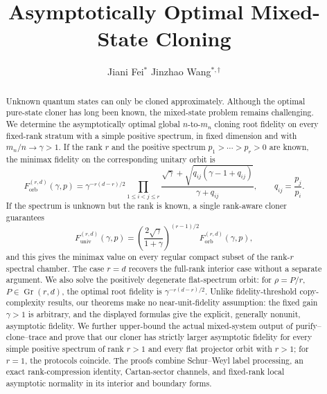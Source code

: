 \documentclass[11pt]{article}
\title{Asymptotically Optimal Mixed-State Cloning}
\author{Jiani Fei\(^{*}\)\qquad
  Jinzhao Wang\(^{*,\dagger}\)}
\date{}
\theoremstyle{remark}
\theoremstyle{plain}
\newcommand{\Gr}{\operatorname{Gr}}
\newcommand{\Forb}{F_{\mathrm{orb}}}
\newcommand{\Funiv}{F_{\mathrm{univ}}}
\begin{document}
\maketitle
\begingroup
\renewcommand{\thefootnote}{\fnsymbol{footnote}}
\endgroup

\begin{abstract}
Unknown quantum states can only be cloned approximately.  Although the
optimal pure-state cloner has long been known, the mixed-state problem remains
challenging.  We determine the asymptotically optimal global
\(n\)-to-\(m_n\) cloning root fidelity on every fixed-rank stratum with a
simple positive spectrum, in fixed dimension and with
\(m_n/n\to\gamma>1\).  If the rank \(r\) and the positive spectrum
\(p_1>\cdots>p_r>0\) are known, the minimax fidelity on the corresponding
unitary orbit is
\[
  \Forb^{(r,d)}(\gamma,p)
  =\gamma^{-r(d-r)/2}\prod_{1\le i<j\le r}
  \frac{\sqrt{\gamma}+\sqrt{q_{ij}(\gamma-1+q_{ij})}}
       {\gamma+q_{ij}},
  \qquad q_{ij}=\frac{p_j}{p_i}.
\]
If the spectrum is unknown but the rank is known, a single rank-aware cloner
guarantees
\[
  \Funiv^{(r,d)}(\gamma,p)
  =\left(\frac{2\sqrt\gamma}{1+\gamma}\right)^{(r-1)/2}
   \Forb^{(r,d)}(\gamma,p),
\]
and this gives the minimax value on every regular compact subset of the
rank-\(r\) spectral chamber.  The case \(r=d\) recovers the full-rank
interior case without a separate argument.  We also solve the positively
degenerate flat-spectrum orbit: for
\(\rho=P/r\), \(P\in\Gr(r,d)\), the optimal root fidelity is
\(\gamma^{-r(d-r)/2}\).  Unlike fidelity-threshold copy-complexity results,
our theorems make no near-unit-fidelity assumption: the fixed gain
\(\gamma>1\) is arbitrary, and the displayed formulas give the explicit,
generally nonunit, asymptotic fidelity.  We further upper-bound the actual
mixed-system output of purify--clone--trace and prove that our cloner has
strictly larger asymptotic fidelity for every simple positive spectrum of
rank \(r>1\) and every flat projector orbit with \(r>1\); for \(r=1\), the
protocols coincide.  The proofs combine Schur--Weyl label processing, an
exact rank-compression identity, Cartan-sector channels, and fixed-rank local
asymptotic normality in its interior and boundary forms.
\end{abstract}
\end{document}
